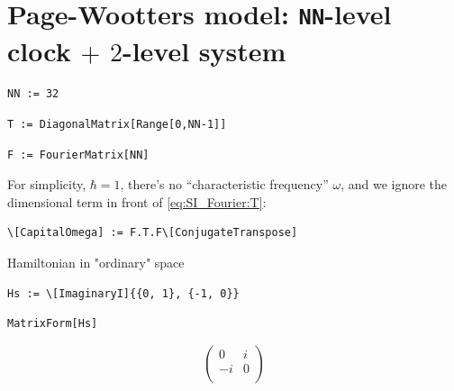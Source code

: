 \section{Page-Wootters model: \texttt{NN}-level clock $+$ $2$-level system}

\begin{lstlisting}
NN := 32
\end{lstlisting}

\begin{lstlisting}
T := DiagonalMatrix[Range[0,NN-1]]
\end{lstlisting}

\begin{lstlisting}
F := FourierMatrix[NN]
\end{lstlisting}

For simplicity, $\hbar = 1$, there's no ``characteristic frequency'' $\omega$,
and we ignore the dimensional term in front of \eqref{eq:SI_Fourier:T}:

\begin{lstlisting}
\[CapitalOmega] := F.T.F\[ConjugateTranspose] 
\end{lstlisting}

Hamiltonian in "ordinary" space
\begin{lstlisting}
Hs := \[ImaginaryI]{{0, 1}, {-1, 0}}
\end{lstlisting}
\begin{lstlisting}
MatrixForm[Hs]
\end{lstlisting}
\[
  \left(
    \begin{array}{cc}
     0 & i \\
     -i & 0 \\
    \end{array}
    \right)
\]

